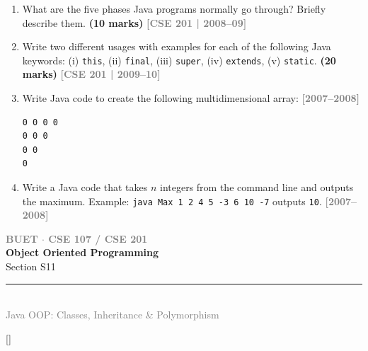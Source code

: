\documentclass[12pt,a3paper]{article}
\newcommand{\yr}[1]{\hfill\textcolor{gray}{\small\textbf{[#1]}}}
\newcommand{\mk}[1]{\textcolor{orange!70!black}{\small\textbf{(#1 marks)}}}
\newcommand{\secdivider}[4]{%
  \newpage\thispagestyle{empty}%
  \vspace*{\fill}%
  \begin{tcolorbox}[enhanced,colback=#4!7,colframe=#3,boxrule=1.5pt,arc=8pt,
    left=20pt,right=20pt,top=22pt,bottom=22pt,
    shadow={3pt}{-3pt}{0pt}{black!15}]
    \centering
    {\large\textcolor{gray}{\textbf{BUET $\cdot$ CSE 107 / CSE 201}}}\\[8pt]
    {\fontsize{26}{32}\selectfont\bfseries\textcolor{#3}{Object Oriented Programming}}\\[6pt]
    {\fontsize{15}{19}\selectfont\textcolor{dgray}{#1}}\\[12pt]
    \textcolor{#3!60}{\rule{0.5\textwidth}{0.5pt}}\\[6pt]
    {\small\textcolor{gray}{#2}}
  \end{tcolorbox}%
  \vspace*{\fill}\newpage%
}
\begin{document}
\begin{enumerate}



\item What are the five phases Java programs normally go through? Briefly describe them. \mk{10}
\yr{CSE 201 | 2008--09}







\item Write two different usages with examples for each of the following Java keywords: (i) \texttt{this}, (ii) \texttt{final}, (iii) \texttt{super}, (iv) \texttt{extends}, (v) \texttt{static}. \mk{20}
\yr{CSE 201 | 2009--10}




\item Write Java code to create the following multidimensional array:
\yr{2007--2008}
\begin{lstlisting}
0 0 0 0
0 0 0
0 0
0
\end{lstlisting}





\item Write a Java code that takes $n$ integers from the command line and outputs the maximum. Example: \texttt{java Max 1 2 4 5 -3 6 10 -7} outputs \texttt{10}.
\yr{2007--2008}






\end{enumerate}
\newpage

\secdivider{Section S11}{Java OOP: Classes, Inheritance \& Polymorphism}{cC}{cC}
\titleformat{\section}{\large\bfseries\color{cC}}{}{0em}{}[\titlerule]
\end{document}
